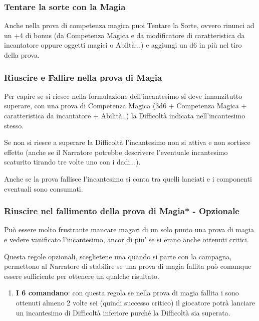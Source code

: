 \begin{multicols}{2}
\subsubsection{Tentare la sorte con la Magia}

Anche nella prova di competenza magica puoi Tentare la Sorte, ovvero rinunci ad un +4 di bonus (da Competenza Magica e  da  modificatore di caratteristica da incantatore oppure oggetti magici o Abiltà...) e aggiungi un d6 in più nel tiro della prova.

\subsubsection{Riuscire e Fallire nella prova di Magia}

Per capire se si riesce nella formulazione dell'incantesimo si deve innanzitutto superare, con una prova di Competenza Magica (3d6 + Competenza Magica + caratteristica da incantatore + Abilità..) la Difficoltà indicata nell'incantesimo stesso.

Se non si riesce a superare la Difficoltà l'incantesimo non si attiva e non sortisce effetto (anche se il Narratore potrebbe descrivere l'eventuale incantesimo scaturito tirando tre volte uno con i dadi...).

Anche se la prova fallisce l'incantesimo si conta tra quelli lanciati e i componenti eventuali sono consumati.

\subsubsection{Riuscire nel fallimento della prova di Magia* - Opzionale}

Può essere molto frustrante mancare magari di un solo punto una prova di magia e vedere vanificato l'incantesimo, ancor di piu' se si erano anche ottenuti critici.

Questa regole opzionali, sceglietene una quando si parte con la campagna, permettono al Narratore di stabilire se una prova di magia fallita può comunque essere sufficiente per ottenere un qualche risultato.

\begin{enumerate}

\item
\textbf{I 6 comandano}: con questa regola se nella prova di magia fallita i sono ottenuti almeno 2 volte sei (quindi successo critico) il giocatore potrà lanciare un incantesimo di Difficoltà inferiore purché la Difficoltà sia superata.


\end{enumerate}
\end{multicols}
